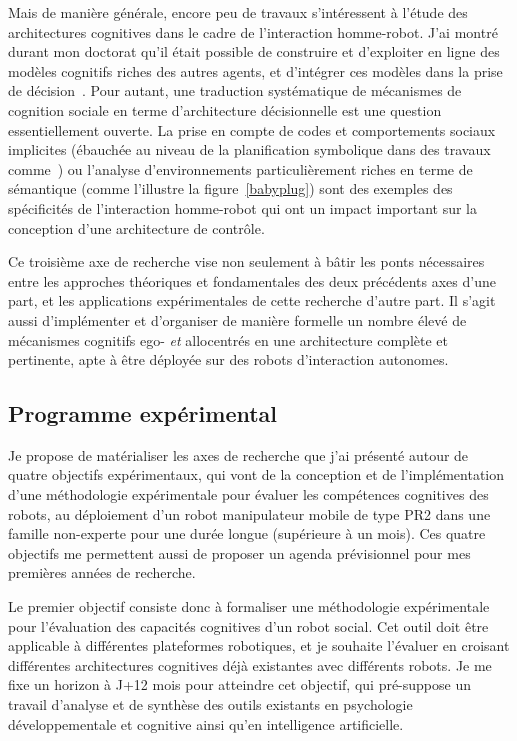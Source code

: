 \documentclass[a4paper]{article}
\begin{document}
Mais de manière générale, encore peu de travaux s'intéressent à l'étude des
architectures cognitives dans le cadre de l'interaction homme-robot. J'ai montré
durant mon doctorat qu'il était possible de construire et d'exploiter en ligne
des modèles cognitifs riches des autres agents, et d'intégrer ces modèles dans
la prise de décision~\cite{alami2011when, warnier2012when, lemaignan2014human}.
Pour autant, une traduction systématique de mécanismes de cognition sociale en
terme d'architecture décisionnelle est une question essentiellement ouverte. La
prise en compte de codes et comportements sociaux implicites (ébauchée au niveau
de la planification symbolique dans des travaux comme~\cite{Alili2009}) ou
l'analyse d'environnements particulièrement riches en terme de sémantique (comme
l'illustre la figure~\ref{babyplug}) sont des exemples des spécificités de
l'interaction homme-robot qui ont un impact important sur la conception d'une
architecture de contrôle.

Ce troisième axe de recherche vise non seulement à bâtir les ponts nécessaires
entre les approches théoriques et fondamentales des deux précédents axes d'une
part, et les applications expérimentales de cette recherche d'autre part. Il
s'agit aussi d'implémenter et d'organiser de manière formelle un nombre élevé de
mécanismes cognitifs ego- \emph{et} allocentrés en une architecture complète et pertinente, apte à être
déployée sur des robots d'interaction autonomes.

\subsection{Programme expérimental}

Je propose de matérialiser les axes de recherche que j'ai présenté autour de
quatre objectifs expérimentaux, qui vont de la conception et de
l'implémentation d'une méthodologie expérimentale pour évaluer les compétences
cognitives des robots, au déploiement d'un robot manipulateur mobile de type
PR2 dans une famille non-experte pour une durée longue (supérieure à un mois).
Ces quatre objectifs me permettent aussi de proposer un agenda prévisionnel
pour mes premières années de recherche.

Le premier objectif consiste donc à formaliser une méthodologie expérimentale
pour l'évaluation des capacités cognitives d'un robot social. Cet outil doit
être applicable à différentes plateformes robotiques, et je souhaite l'évaluer
en croisant différentes architectures cognitives déjà existantes avec différents
robots.  Je me fixe un horizon à J+12 mois pour atteindre cet objectif, qui
pré-suppose un travail d'analyse et de synthèse des outils existants en
psychologie développementale et cognitive ainsi qu'en intelligence
artificielle.
\end{document}
